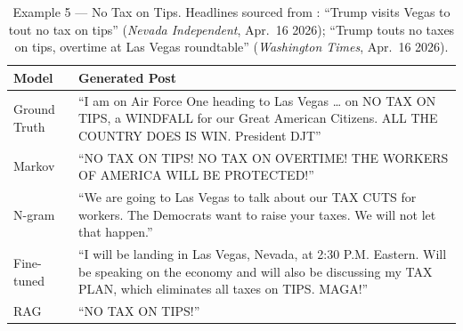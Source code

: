 \documentclass[11pt,a4paper]{article}
\begin{document}
\begin{table}[H]
\centering
\caption{Example 5 --- No Tax on Tips. Headlines sourced from \citet{nevadaindep2026tips,washtimes2026tips}: ``Trump visits Vegas to tout no tax on tips'' (\textit{Nevada Independent}, Apr.\ 16 2026); ``Trump touts no taxes on tips, overtime at Las Vegas roundtable'' (\textit{Washington Times}, Apr.\ 16 2026).}
\label{tab:qual5}
\begin{tabular}{lp{9.5cm}}
\toprule
\textbf{Model} & \textbf{Generated Post} \\
\midrule
Ground Truth  & ``I am on Air Force One heading to Las Vegas \ldots{} on NO TAX ON TIPS, a WINDFALL for our Great American Citizens. ALL THE COUNTRY DOES IS WIN. President DJT'' \\
\midrule
Markov        & ``NO TAX ON TIPS! NO TAX ON OVERTIME! THE WORKERS OF AMERICA WILL BE PROTECTED!'' \\
N-gram        & ``We are going to Las Vegas to talk about our TAX CUTS for workers. The Democrats want to raise your taxes. We will not let that happen.'' \\
Fine-tuned    & ``I will be landing in Las Vegas, Nevada, at 2:30 P.M. Eastern. Will be speaking on the economy and will also be discussing my TAX PLAN, which eliminates all taxes on TIPS. MAGA!'' \\
RAG           & ``NO TAX ON TIPS!'' \\
\bottomrule
\end{tabular}
\end{table}
\end{document}
